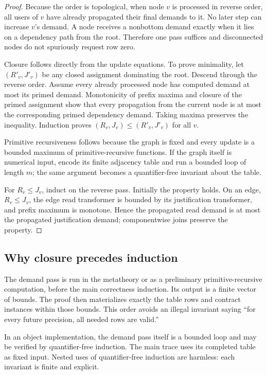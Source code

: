 \begin{proof}
Because the order is topological, when node \(v\) is processed in reverse order, all
users of \(v\) have already propagated their final demands to it.  No later step can
increase \(v\)'s demand.  A node receives a nonbottom demand exactly when it lies on a
dependency path from the root.  Therefore one pass suffices and disconnected nodes do
not spuriously request row zero.

Closure follows directly from the update equations.  To prove minimality, let
\((R'_v,J'_v)\) be any closed assignment dominating the root.  Descend through the
reverse order.  Assume every already processed node has computed demand at most its
primed demand.  Monotonicity of prefix maxima and closure of the primed assignment show
that every propagation from the current node is at most the corresponding primed
dependency demand.  Taking maxima preserves the inequality.  Induction proves
\((R_v,J_v)\le(R'_v,J'_v)\) for all \(v\).

Primitive recursiveness follows because the graph is fixed and every update is a
bounded maximum of primitive-recursive functions.  If the graph itself is numerical
input, encode its finite adjacency table and run a bounded loop of length \(m\); the
same argument becomes a quantifier-free invariant about the table.

For \(R_v\le J_v\), induct on the reverse pass.  Initially the property holds.  On an
edge, \(R_v\le J_v\), the edge read transformer is bounded by its justification
transformer, and prefix maximum is monotone.  Hence the propagated read demand is at
most the propagated justification demand; componentwise joins preserve the property.
\end{proof}

\subsection{Why closure precedes induction}

The demand pass is run in the metatheory or as a preliminary primitive-recursive
computation, before the main correctness induction.  Its output is a finite vector of
bounds.  The proof then materializes exactly the table rows and contract instances
within those bounds.  This order avoids an illegal invariant saying ``for every future
precision, all needed rows are valid.''

In an object implementation, the demand pass itself is a bounded loop and may be
verified by quantifier-free induction.  The main trace uses its completed table as
fixed input.  Nested uses of quantifier-free induction are harmless: each invariant is
finite and explicit.


